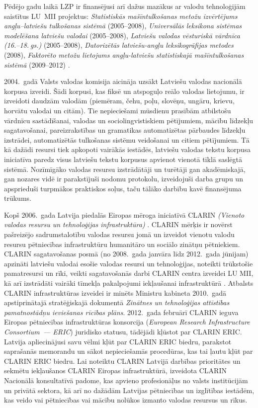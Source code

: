 \begin{multicols}{2}
Pēdējo gadu laikā LZP ir finansējusi arī dažus mazākus ar valodu tehnoloģijām saistītus LU~MII projektus: \textit{Statistiskās mašīntulkošanas metožu izvērtējums angļu--latviešu tulkošanas sistēmā} (2005--2008), \textit{\mbox{Universālās} leksikona sistēmas modelēšana latviešu \mbox{valodai}} (2005--2008), \textit{Latviešu valodas vēsturiskā vārdnīca (16.--18.${}^{~}$gs.)} (2005--2008), \textit{Datorizētās latviešu-angļu leksikogrāfijas metodes} (2008), \textit{Faktorēto metožu lietojums angļu-latviešu statistiskajā mašīntulkošanas sistēmā} (2009--2012) \cite{Meta27}.

2004.~gadā Valsts valodas komisija aicināja uzsākt Latviešu valodas nacionālā korpusa izveidi.  Šādi korpusi, kas fiksē un atspoguļo reālo valodas lietojumu, ir izveidoti daudzām valodām (piemēram, čehu, poļu, slovēņu, ungāru, krievu, horvātu valodai un citām).  Tie nepieciešami mūsdienu prasībām atbilstošu vārdnīcu sastādīšanai, valodas un sociolingvistiskiem pētījumiem, mācību līdzekļu sagatavošanai, pareizrakstības un gramatikas automatizētas pārbaudes līdzekļu izstrādei, automatizētās tulkošanas sistēmu veidošanai un citiem pētījumiem.  Tā kā dažādi resursi tiek apkopoti vairākās iestādēs, latviešu valodas tekstu korpusa iniciatīva paredz visus latviešu tekstu korpusus apvienot vienotā tīklā saslēgtā sistēmā.  Nozīmīgāko valodas resursu izstrādātāji un turētāji gan akadēmiskajā, gan nozares vidē ir parakstījuši nodomu protokolu, izveidojuši darba grupu un apsprieduši turpmākos praktiskos soļus, taču tālāko darbību kavē finansējuma trūkums.

Kopš 2006.~gada Latvija piedalās Eiropas mēroga iniciatīvā CLARIN \textit{(Vienoto valodas resursu un tehnoloģijas infrastruktūra)} \cite{metaClarin}.  CLARIN mērķis ir novērst pašreizējo sadrumstalotību valodas resursu jomā un izveidot vienotu valodu resursu pētniecības infrastruktūru humanitāro un sociālo zinātņu pētniekiem.  CLARIN sagatavošanas posmā (no 2008.~gada janvāra līdz 2012.~gada jūnijam) apzināti latviešu valodai esošie valodas resursi un tehnoloģijas, noteikti trūkstošie pamatresursi un rīki, veikti sagatavošanās darbi CLARIN centra izveidei LU MII, kā arī izstrādāti vairāki tīmekļa pakalpojumi iekļaušanai infrastruktūrā \cite{metaClarin}.  Atbalsts CLARIN infrastruktūras izveidei ir minēts Ministru kabineta 2010.~gadā apstiprinātajā stratēģiskajā dokumentā \textit{Zinātnes un tehnoloģijas attīstības pamatnostādņu ieviešanas rīcības plāns}.  2012.~gada februārī CLARIN ieguva Eiropas pētniecības infrastruktūras konsorcija (\textit{European Research Infrastructure Consortium~--- ERIC}) juridisko statusu, tādējādi kļūstot par CLARIN ERIC.  Latvija apliecinājusi savu vēlmi kļūt par CLARIN ERIC biedru, parakstot saprašanās memorandu un sākot nepieciešamās procedūras, kas tai ļautu kļūt par CLARIN ERIC biedru.  Lai noteiktu CLARIN Latvijā darbības prioritātes un sekmētu iekļaušanos CLARIN Eiropas infrastruktūrā, izveidota CLARIN Nacionālā konsultatīvā padome, kas apvieno profesionāļus no valsts institūcijām un privātā sektora, kā arī no dažādām Latvijas pētniecības un izglītības iestādēm, kas veido vai pētniecības vai mācību nolūkos izmanto valodas resursus un rīkus.


\end{multicols}
